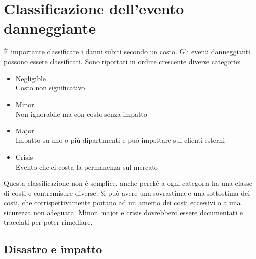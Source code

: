 \section{Classificazione dell'evento danneggiante}

\`E importante classificare i danni subiti secondo un costo.
Gli eventi danneggianti possono essere classificati. Sono riportati in ordine 
crescente diverse categorie:

\begin{itemize}
\item Negligible \\
Costo non significativo
\item Minor \\
Non ignorabile ma con costo senza impatto
\item Major \\
Impatto su uno o più dipartimenti e può impattare sui clienti esterni
\item Crisis \\
Evento che ci costa la permanenza sul mercato
\end{itemize}

Questa classificazione non \`e semplice, anche perché a ogni categoria ha una 
classe di costi e contromisure diverse. Si pu\`o avere una sovrastima e una 
sottostima dei costi, che corrispettivamente portano ad un amento dei costi 
eccessivi o a una sicurezza non adeguata.
Minor, major e crisis dovrebbero essere documentati e tracciati per poter 
rimediare.

\subsection{Disastro e impatto}

